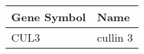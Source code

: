 \begin{tabular}{ll}
\toprule
Gene Symbol &     Name \\
\midrule
       CUL3 & cullin 3 \\
\bottomrule
\end{tabular}
